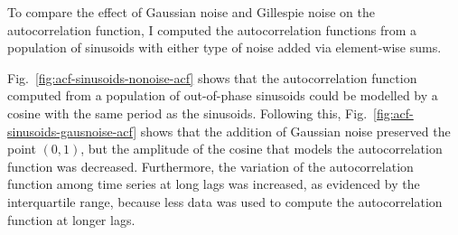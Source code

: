 To compare the effect of Gaussian noise and Gillespie noise on the autocorrelation function, I computed the autocorrelation functions from a population of sinusoids with either type of noise added via element-wise sums.


Fig.\ \ref{fig:acf-sinusoids-nonoise-acf} shows that the autocorrelation function computed from a population of out-of-phase sinusoids could be modelled by a cosine with the same period as the sinusoids.
Following this, Fig.\ \ref{fig:acf-sinusoids-gausnoise-acf} shows that the addition of Gaussian noise preserved the point $(0,1)$, but the amplitude of the cosine that models the autocorrelation function was decreased.
Furthermore, the variation of the autocorrelation function among time series at long lags was increased, as evidenced by the interquartile range, because less data was used to compute the autocorrelation function at longer lags.%


